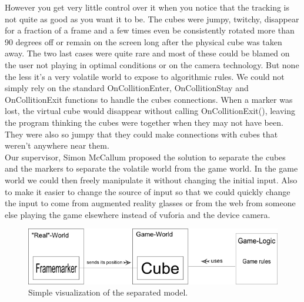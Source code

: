However you get very little control over it when you notice that the tracking is not quite as good as you want it to be. The cubes were jumpy, twitchy, disappear for a fraction of a frame and a few times even be consistently rotated more than 90 degrees off or remain on the screen long after the physical cube was taken away. The two last cases were quite rare and most of these could be blamed on the user not playing in optimal conditions or on the camera technology. But none the less it's a very volatile world to expose to algorithmic rules. We could not simply rely on the standard OnCollitionEnter, OnCollitionStay and  OnCollitionExit functions to handle the cubes connections. When a marker was lost, the virtual cube would disappear without calling OnCollitionExit(), leaving the program thinking the cubes were together when they may not have been. They were also so jumpy that they could make connections with cubes that weren't anywhere near them.\\
Our supervisor, Simon McCallum proposed the solution to separate the cubes and the markers to separate the volatile world from the game world. In the game world we could then freely manipulate it without changing the initial input. Also to make it easier to change the source of input so that we could quickly change the input to come from augmented reality glasses or from the web from someone else playing the game elsewhere instead of vuforia and the device camera.

\begin{figure}[ht] 
        \capstart
        \centering  
        \includegraphics[width=\textwidth]{includes/complexCubeMarkerModel.png}    
        \caption[Separated Cube-Marker model]{Simple visualization of the separated model.} 
        \label{fig:complex_cube_marker_model} 
\end{figure}

